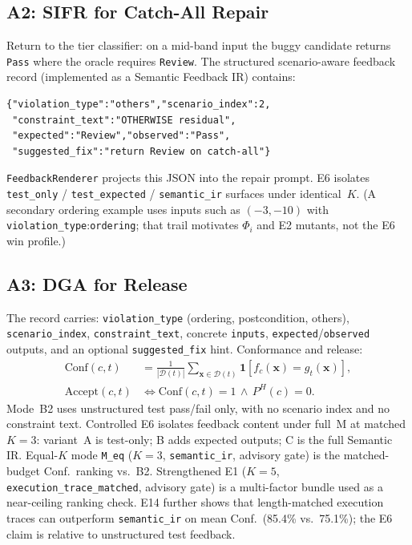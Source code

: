 \documentclass[10pt,conference]{IEEEtran}
\begin{document}
\subsection{A2: SIFR for Catch-All Repair}
Return to the tier classifier: on a mid-band input the buggy candidate returns
\texttt{Pass} where the oracle requires \texttt{Review}.
The structured scenario-aware feedback record (implemented as a Semantic
Feedback IR) contains:
\begin{lstlisting}
{"violation_type":"others","scenario_index":2,
 "constraint_text":"OTHERWISE residual",
 "expected":"Review","observed":"Pass",
 "suggested_fix":"return Review on catch-all"}
\end{lstlisting}
\texttt{FeedbackRenderer} projects this JSON into the repair prompt.
E6 isolates \texttt{test\_only} / \texttt{test\_expected} / \texttt{semantic\_ir}
surfaces under identical~$K$.
(A secondary ordering example uses inputs such as $(-3,-10)$ with
\texttt{violation\_type}:\texttt{ordering}; that trail motivates $\Phi_i$ and
E2 mutants, not the E6 win profile.)

\subsection{A3: DGA for Release}
The record carries: \texttt{violation\_type} (ordering,
postcondition, others), \texttt{scenario\_index}, \texttt{constraint\_text},
concrete \texttt{inputs}, \texttt{expected}/\texttt{observed} outputs, and an
optional \texttt{suggested\_fix} hint.
Conformance and release:
\begin{align}
  \mathrm{Conf}(c,t)
  &= \tfrac{1}{|\mathcal{D}(t)|}
     \sum_{\mathbf{x}\in\mathcal{D}(t)}
     \mathbf{1}[f_c(\mathbf{x})=g_t(\mathbf{x})], \\
  \mathrm{Accept}(c,t)
  &\iff \mathrm{Conf}(c,t)=1 \,\land\, P^H(c)=0.
\end{align}
Mode~B2 uses unstructured test pass/fail only, with no scenario index and no
constraint text.
Controlled E6 isolates feedback content under full~M at matched $K{=}3$:
variant~A is test-only; B adds expected outputs; C is the full Semantic IR.
Equal-$K$ mode \texttt{M\_eq} ($K{=}3$, \texttt{semantic\_ir}, advisory gate)
is the matched-budget Conf.\ ranking vs.\ B2.
Strengthened E1 ($K{=}5$, \texttt{execution\_trace\_matched}, advisory gate)
is a multi-factor bundle used as a near-ceiling ranking check.
E14 further shows that length-matched execution traces can outperform
\texttt{semantic\_ir} on mean Conf.\ (85.4\% vs.\ 75.1\%); the E6 claim is
relative to unstructured test feedback.
\end{document}
